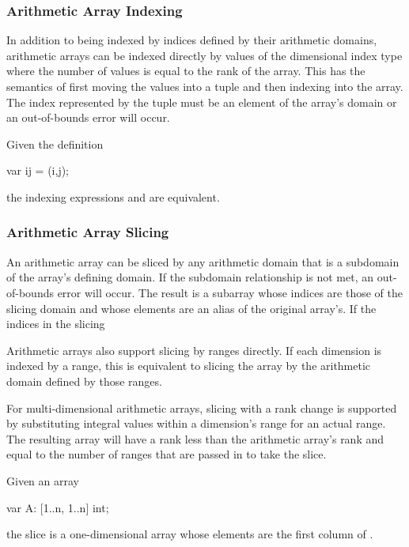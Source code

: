 \subsubsection{Arithmetic Array Indexing}
\label{Arithmetic_Array_Indexing}

In addition to being indexed by indices defined by their arithmetic
domains, arithmetic arrays can be indexed directly by values of the
dimensional index type where the number of values is equal to the rank
of the array.  This has the semantics of first moving the values into
a tuple and then indexing into the array.  The index represented by
the tuple must be an element of the array's domain or an out-of-bounds
error will occur.

\begin{example}
Given the definition
\begin{chapel}
  var ij = (i,j);
\end{chapel}
the indexing expressions  and  are
equivalent.
\end{example}

\subsubsection{Arithmetic Array Slicing}
\label{Arithmetic_Array_Slicing}

An arithmetic array can be sliced by any arithmetic domain that is a
subdomain of the array's defining domain.  If the subdomain
relationship is not met, an out-of-bounds error will occur.  The
result is a subarray whose indices are those of the slicing domain and
whose elements are an alias of the original array's.  If the indices
in the slicing

Arithmetic arrays also support slicing by ranges directly.  If each
dimension is indexed by a range, this is equivalent to slicing the
array by the arithmetic domain defined by those ranges.

For multi-dimensional arithmetic arrays, slicing with a rank change is
supported by substituting integral values within a dimension's range
for an actual range.  The resulting array will have a rank less than
the arithmetic array's rank and equal to the number of ranges that are
passed in to take the slice.

\begin{example}
Given an array
\begin{chapel}
var A: [1..n, 1..n] int;
\end{chapel}
the slice  is a one-dimensional array whose elements
are the first column of .
\end{example}

